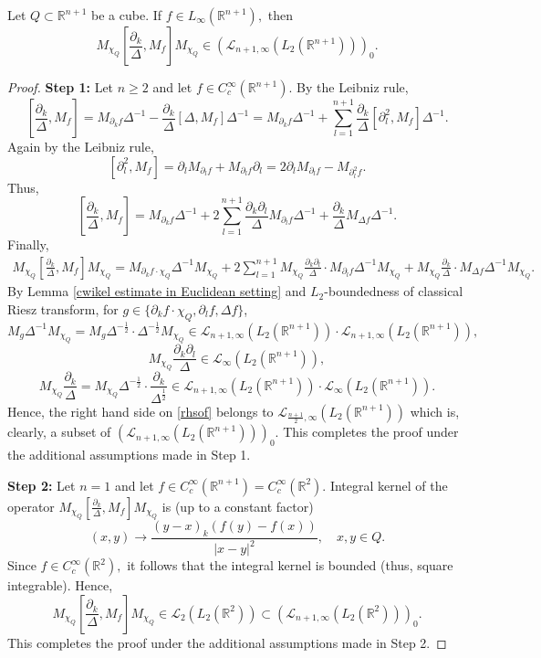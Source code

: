 \documentclass[12pt]{amsart}
\begin{document}
\begin{lemma}\label{mtb separable part lemma} Let $Q\subset\mathbb{R}^{n+1}$ be a cube. If $f\in L_{\infty}(\mathbb{R}^{n+1}),$ then
$$M_{\chi_Q}[\frac{\partial_k}{\Delta},M_f]M_{\chi_Q}\in (\mathcal{L}_{n+1,\infty}(L_2(\mathbb{R}^{n+1})))_0.$$
\end{lemma}
\begin{proof} {\bf Step 1:} Let $n\geq 2$ and let $f\in C^{\infty}_c(\mathbb{R}^{n+1}).$ By the Leibniz rule,
$$[\frac{\partial_k}{\Delta},M_f]=M_{\partial_kf}\Delta^{-1}-\frac{\partial_k}{\Delta}[\Delta,M_f]\Delta^{-1}=M_{\partial_kf}\Delta^{-1}+\sum_{l=1}^{n+1}\frac{\partial_k}{\Delta}[\partial_l^2,M_f]\Delta^{-1}.$$
Again by the Leibniz rule,
$$[\partial_l^2,M_f]=\partial_lM_{\partial_lf}+M_{\partial_lf}\partial_l=2\partial_lM_{\partial_lf}-M_{\partial_l^2f}.$$
Thus,
$$[\frac{\partial_k}{\Delta},M_f]=M_{\partial_kf}\Delta^{-1}+2\sum_{l=1}^{n+1}\frac{\partial_k\partial_l}{\Delta}M_{\partial_lf}\Delta^{-1}+\frac{\partial_k}{\Delta}M_{\Delta f}\Delta^{-1}.$$
Finally,
\begin{align}\label{rhsof}
M_{\chi_Q}[\frac{\partial_k}{\Delta},M_f]M_{\chi_Q}=M_{\partial_kf\cdot \chi_Q}\Delta^{-1}M_{\chi_Q}
+2\sum_{l=1}^{n+1}M_{\chi_Q}\frac{\partial_k\partial_l}{\Delta}\cdot M_{\partial_lf}\Delta^{-1}M_{\chi_Q}+M_{\chi_Q}\frac{\partial_k}{\Delta}\cdot M_{\Delta f}\Delta^{-1}M_{\chi_Q}.
\end{align}
By Lemma \ref{cwikel estimate in Euclidean setting} and $L_2$-boundedness of classical Riesz transform, for $g\in \{\partial_kf\cdot\chi_Q,\partial_lf,\Delta f\}$,
$$M_{g}\Delta^{-1}M_{\chi_Q}=M_{g}\Delta^{-\frac12}\cdot\Delta^{-\frac12}M_{\chi_Q}\in \mathcal{L}_{n+1,\infty}(L_2(\mathbb{R}^{n+1}))\cdot \mathcal{L}_{n+1,\infty}(L_2(\mathbb{R}^{n+1})),$$
$$M_{\chi_Q}\frac{\partial_k\partial_l}{\Delta}\in \mathcal{L}_{\infty}(L_2(\mathbb{R}^{n+1})),$$
$$M_{\chi_Q}\frac{\partial_k}{\Delta}=M_{\chi_Q}\Delta^{-\frac12}\cdot\frac{\partial_k}{\Delta^{\frac12}}\in \mathcal{L}_{n+1,\infty}(L_2(\mathbb{R}^{n+1}))\cdot \mathcal{L}_{\infty}(L_2(\mathbb{R}^{n+1})).$$
Hence, the right hand side on \eqref{rhsof} belongs to $\mathcal{L}_{\frac{n+1}{2},\infty}(L_2(\mathbb{R}^{n+1}))$ which is, clearly, a subset of $(\mathcal{L}_{n+1,\infty}(L_2(\mathbb{R}^{n+1})))_0.$ This completes the proof under the additional assumptions made in Step 1.
	

{\bf Step 2:} Let $n=1$ and let $f\in C^{\infty}_c(\mathbb{R}^{n+1})=C^{\infty}_c(\mathbb{R}^2).$ Integral kernel of the operator $M_{\chi_Q}[\frac{\partial_k}{\Delta},M_f]M_{\chi_Q}$ is (up to a constant factor)
$$(x,y)\to\frac{(y-x)_k(f(y)-f(x))}{|x-y|^2},\quad x,y\in Q.$$
Since $f\in C^{\infty}_c(\mathbb{R}^2),$ it follows that the integral kernel is bounded (thus, square integrable).  Hence, $$M_{\chi_Q}[\frac{\partial_k}{\Delta},M_f]M_{\chi_Q}\in\mathcal{L}_2(L_2(\mathbb{R}^2))\subset (\mathcal{L}_{n+1,\infty}(L_2(\mathbb{R}^2)))_0.$$ This completes the proof under the additional assumptions made in Step 2.


\end{proof}
\end{document}
